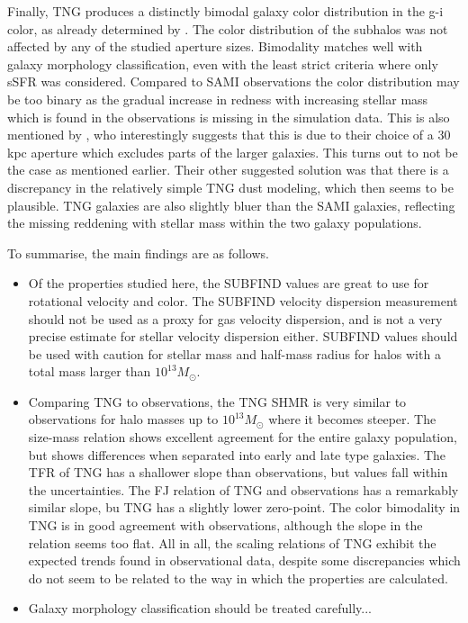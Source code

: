Finally, TNG produces a distinctly bimodal galaxy color distribution in the g-i color, as already determined by \textcite{Nelson2017}. The color distribution of the subhalos was not affected by any of the studied aperture sizes. Bimodality matches well with galaxy morphology classification, even with the least strict criteria where only sSFR was considered. Compared to SAMI observations the color distribution may be too binary as the gradual increase in redness with increasing stellar mass which is found in the observations is missing in the simulation data.  This is also mentioned by \textcite{Nelson2017}, who interestingly suggests that this is due to their choice of a 30 kpc aperture which excludes parts of the larger galaxies. This turns out to not be the case as mentioned earlier. Their other suggested solution was that there is a discrepancy in the relatively simple TNG dust modeling, which then seems to be plausible. TNG galaxies are also slightly bluer than the SAMI galaxies, reflecting the missing reddening with stellar mass within the two galaxy populations.


To summarise, the main findings are as follows.
\begin{itemize}
	\item Of the properties studied here, the SUBFIND values are great to use for rotational velocity and color. The SUBFIND velocity dispersion measurement should not be used as a proxy for gas velocity dispersion, and is not a very precise estimate for stellar velocity dispersion either. SUBFIND values should be used with caution for stellar mass and half-mass radius for halos with a total mass larger than $10^{13} M_\odot$.
	\item Comparing TNG to observations, the TNG SHMR is very similar to observations for halo masses up to $10^{13} M_\odot$ where it becomes steeper. The size-mass relation shows excellent agreement for the entire galaxy population, but shows differences when separated into early and late type galaxies. The TFR of TNG has a shallower slope than observations, but values fall within the uncertainties. The FJ relation of TNG and observations has a remarkably similar slope, bu TNG has a slightly lower zero-point. The color bimodality in TNG is in good agreement with observations, although the slope in the relation seems too flat. All in all, the scaling relations of TNG exhibit the expected trends found in observational data, despite some discrepancies which do not seem to be related to the way in which the properties are calculated.
	\item Galaxy morphology classification should be treated carefully...

\end{itemize}

